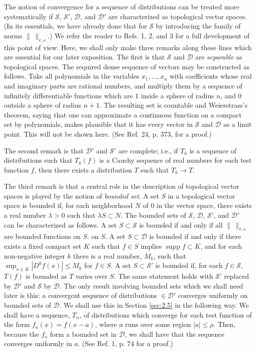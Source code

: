 The notion of convergence for a sequence of distributions can be treated more
systematically if $\mathcal{S}$, $\mathcal{S}'$, $\mathcal{D}$, and
$\mathcal{D}'$ are characterized as topological vector spaces. (In its
essentials, we have already done that for $\mathcal{S}$ by introducing the
family of norms $\|\ \|_{r,s}$.) We refer the reader to Refs. 1, 2, and 3 for
a full development of this point of view. Here, we shall only make three
remarks along these lines which are essential for our later exposition. The
first is that $\mathcal{S}$ and $\mathcal{D}$ are \emph{separable} as
topological spaces. The required dense sequence of vectors may be constructed
as follows. Take all polynomials in the variables $x_1,\ldots,x_n$ with
coefficients whose real and imaginary parts are rational numbers, and multiply
them by a sequence of infinitely differentiable functions which are $1$ inside
a sphere of radius $n$, and $0$ outside a sphere of radius $n+1$. The
resulting set is countable and Weierstrass's theorem, saying that one can
approximate a continuous function on a compact set by polynomials, makes
plausible that it has every vector in $\mathcal{S}$ and $\mathcal{D}$ as a
limit point. This will not be shown here. (See Ref. 24, p. 373, for a proof.)

The second remark is that $\mathcal{D}'$ and $\mathcal{S}'$ are complete;
i.e., if $T_k$ is a sequence of distributions such that $T_k(f)$ is a Cauchy
sequence of real numbers for each test function $f$, then there exists a
distribution $T$ such that $T_k\to T$.

The third remark is that a central role in the description of topological
vector spaces is played by the notion of \emph{bounded set}. A set $S$ in a
topological vector space is bounded if, for each neighborhood $N$ of $0$ in
the vector space, there exists a real number $\lambda>0$ such that
$\lambda S\subset N$. The bounded sets of $\mathcal{S}$, $\mathcal{D}$,
$\mathcal{S}'$, and $\mathcal{D}'$ can be characterized as follows. A set
$S\subset\mathcal{S}$ is bounded if and only if all $\|\ \|_{r,s}$ are
bounded functions on $S$.
on $S$. A set $S\subset\mathcal{D}$ is bounded if and only if there exists a
fixed compact set $K$ such that $f\in S$ implies $\operatorname{supp}f\subset K$,
and for each non-negative integer $k$ there is a real number, $M_k$, such that
$\sup_{x\in K}|D^kf(x)|\le M_k$ for $f\in S$. A set $S\subset\mathcal{S}'$ is
bounded if, for each $f\in\mathcal{S}$, $T(f)$ is bounded as $T$ varies over
$S$. The same statement holds with $\mathcal{S}'$ replaced by $\mathcal{D}'$
and $\mathcal{S}$ by $\mathcal{D}$. The only result involving bounded sets
which we shall need later is this: a convergent sequence of distributions
$\in\mathcal{D}'$ converges uniformly on bounded sets of $\mathcal{D}$. We
shall use this in Section \ref{sec:2.5} in the following way. We shall have a sequence,
$T_n$, of distributions which converge for each test function of the form
$f_a(x)=f(x-a)$, where $a$ runs over some region $|a|\le\rho$. Then, because
the $f_a$ form a bounded set in $\mathcal{D}$, we shall have that the sequence
converges uniformly in $a$. (See Ref. 1, p. 74 for a proof.)

